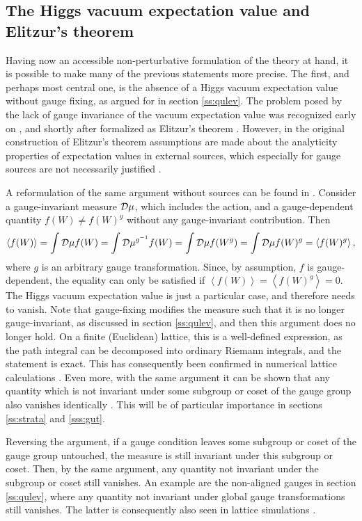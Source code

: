 \documentclass[final,twoside,12pt]{article}
\newcommand*{\no}{\noindent}
\newcommand*{\be}{\begin{equation}}
\newcommand*{\ee}{\end{equation}}
\newcommand*{\1}{1\!\!\!\bot}
\newcommand*{\la}{\left\langle}
\newcommand*{\ra}{\right\rangle}
\begin{document}
\subsection{The Higgs vacuum expectation value and Elitzur's theorem}\label{ss:vev}

Having now an accessible non-perturbative formulation of the theory at hand, it is possible to make many of the previous statements more precise. The first, and perhaps most central one, is the absence of a Higgs vacuum expectation value without gauge fixing, as argued for in section \ref{ss:qulev}. The problem posed by the lack of gauge invariance of the vacuum expectation value was recognized early on \cite{Lee:1974zg,Fischler:1974ue}, and shortly after formalized as Elitzur's theorem \cite{Elitzur:1975im}. However, in the original construction of Elitzur's theorem assumptions are made about the analyticity properties of expectation values in external sources, which especially for gauge sources are not necessarily justified \cite{Maas:2013sca}.

A reformulation of the same argument without sources can be found in \cite{Frohlich:1980gj}. Consider a gauge-invariant measure ${\cal D}\mu$, which includes the action, and a gauge-dependent quantity $f(W)\neq f(W)^g$ without any gauge-invariant contribution. Then \cite{Frohlich:1980gj}
\be
\la f(W)\ra=\int{\cal D}\mu f(W)=\int{\cal D}\mu^{g^{-1}}f(W)=\int{\cal D}\mu f(W^{g})=\int{\cal D}\mu f(W)^g=\la f(W)^g\ra\label{fmsel},
\ee
\no where $g$ is an arbitrary gauge transformation. Since, by assumption, $f$ is gauge-dependent, the equality can only be satisfied if $\la f(W)\ra=\la f(W)^g\ra=0$. The Higgs vacuum expectation value is just a particular case, and therefore needs to vanish. Note that gauge-fixing modifies the measure such that it is no longer gauge-invariant, as discussed in section \ref{ss:qulev}, and then this argument does no longer hold. On a finite (Euclidean) lattice, this is a well-defined expression, as the path integral can be decomposed into ordinary Riemann integrals, and the statement is exact. This has consequently been confirmed in numerical lattice calculations \cite{Caudy:2007sf,Maas:2012ct}. Even more, with the same argument it can be shown that any quantity which is not invariant under some subgroup or coset of the gauge group also vanishes identically \cite{Frohlich:1980gj}. This will be of particular importance in sections \ref{ss:strata} and \ref{sss:gut}.

Reversing the argument, if a gauge condition leaves some subgroup or coset of the gauge group untouched, the measure is still invariant under this subgroup or coset. Then, by the same argument, any quantity not invariant under the subgroup or coset still vanishes. An example are the non-aligned gauges in section \ref{ss:qulev}, where any quantity not invariant under global gauge transformations still vanishes. The latter is consequently also seen in lattice simulations \cite{Maas:2012ct}.
\end{document}

